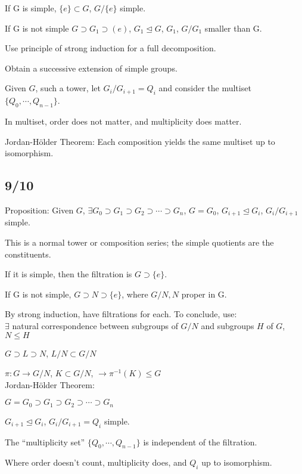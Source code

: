 \documentclass[12pt]{article}
\begin{document}
If G is simple, $\{e\} \subset G$, $G/\{e\}$ simple.

If G is not simple $G \supset G_1 \supset (e)$, $G_1 \trianglelefteq G$, $G_1$, $G/G_1$ smaller than G.

Use principle of strong induction for a full decomposition.

Obtain a successive extension of simple groups.

\noindent
Given $G$, such a tower, let $G_i/G_{i+1} = Q_i$ and consider the multiset $\{Q_0,\cdots , Q_{n-1}\}$.

In multiset, order does not matter, and multiplicity does matter.

\noindent
Jordan-H\"{o}lder Theorem: Each composition yields the same multiset up to isomorphism.

\subsection{9/10}

\noindent
Proposition: Given $G$, $\exists G_0 \supset G_1 \supset G_2 \supset \cdots \supset G_n$, $G = G_0$, $G_{i + 1} \trianglelefteq G_i$, $G_i/G_{i+1}$ simple.

This is a normal tower or composition series; the simple quotients are the constituents.

If it is simple, then the filtration is $G \supset \{e\}$.

If G is not simple, $G \supset N \supset \{e\}$, where $G/N, N$ proper in G.

By strong induction, have filtrations for each.  To conclude, use:\\

$\exists$ natural correspondence between subgroups of $G/N$ and subgroups $H$ of $G$, $N \leq H$

$G \supset L \supset N$, $L/N \subset G/N$

$\pi: G \to G/N$,  $K \subset G/N$, $\to \pi^{-1}(K) \leq G$\\

\noindent
Jordan-H\"{o}lder Theorem:

$G = G_0 \supset G_1 \supset G_2 \supset \cdots \supset G_n$

$G_{i + 1} \trianglelefteq G_i$, $G_i/G_{i + 1} = Q_i$ simple.

The ``multiplicity set'' $\{Q_0, \cdots, Q_{n - 1}\}$ is independent of the filtration.

Where order doesn't count, multiplicity does, and $Q_i$ up to isomorphism.\\
\end{document}
